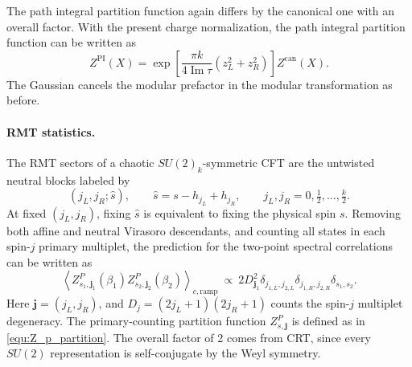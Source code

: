 \documentclass[11pt]{article}
\numberwithin{equation}{section}
\begin{document}
The path integral partition function again differs by the canonical one with an overall factor. With the present charge normalization, the path integral partition function can be written as
\begin{equation}
Z^{\mathrm{PI}}(X)
 =\exp\!\left[\frac{\pi k}{4\operatorname{Im}\tau}(z_L^2+z_R^2)\right]
 Z^{\mathrm{can}}(X).
\end{equation}
The Gaussian cancels the modular prefactor in the modular transformation as before.


\paragraph{RMT statistics.}
The RMT sectors of a chaotic $SU(2)_k$-symmetric CFT are the untwisted neutral blocks labeled by
\begin{equation}
(j_L,j_R;\hat s),
\qquad \hat s=s-h_{j_L}+h_{j_R},
\qquad j_L,j_R=0,\tfrac12,\ldots,\tfrac k2.
\label{eq:su2-sector-labels}
\end{equation}
At fixed $(j_L,j_R)$, fixing $\hat s$ is equivalent to fixing the physical spin $s$. Removing both affine and neutral Virasoro descendants, and counting all states in each spin-$j$ primary multiplet, the prediction for the two-point spectral correlations can be written as
\begin{equation}
\left\langle Z^P_{s_1,\mathbf j_1}(\beta_1)
 Z^P_{s_2,\mathbf j_2}(\beta_2)\right\rangle_{c,\mathrm{ramp}}
 \ \propto\ 2D_{\mathbf j_1}^2
 \delta_{j_{1,L},j_{2,L}}\delta_{j_{1,R},j_{2,R}}\delta_{s_1,s_2}.
\label{eq:su2-diagonal-prediction}
\end{equation}
Here $\mathbf j=(j_L,j_R)$, and $D_j=(2j_L+1)(2j_R+1)$ counts the spin-$j$ multiplet degeneracy. The primary-counting partition function $ Z^P_{s,\mathbf j}$ is defined as in \eqref{equ:Z_p_partition}. The overall factor of 2 comes from CRT, since every $SU(2)$ representation is self-conjugate by the Weyl symmetry.
\end{document}
